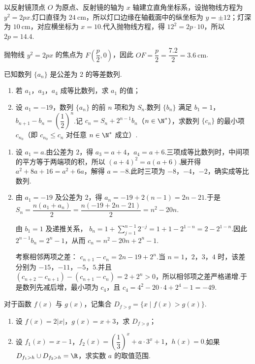 \begin{solution}
以反射镜顶点 \(O\) 为原点、反射镜的轴为 \(x\) 轴建立直角坐标系，设抛物线方程为 \(y^2=2px\).灯口直径为 \(24\mathrm{~cm}\)，所以灯口边缘在轴截面中的纵坐标为 \(y=\pm12\)；灯深为 \(10\mathrm{~cm}\)，对应横坐标为 \(x=10\).代入抛物线方程，得
\(12^2=2p\cdot10\)，所以 \(2p=14.4\).

抛物线 \(y^2=2px\) 的焦点为 \(F\left(\dfrac p2,0\right)\)，因此
\(OF=\dfrac p2=\dfrac{7.2}{2}=3.6\mathrm{~cm}\).
\end{solution}

\begin{problem}
已知数列 \(\{a_n\}\) 是公差为 \(2\) 的等差数列.

\begin{enumerate}
\item 若 \(a_1\)，\(a_3\)，\(a_4\) 成等比数列，求 \(a_1\) 的值；
\item 设 \(a_1=-19\)，数列 \(\{a_n\}\) 的前 \(n\) 项和为 \(S_n\).数列 \(\{b_n\}\) 满足 \(b_1=1\)，\(b_{n+1}-b_n=\left(\dfrac12\right)^n\).记 \(c_n=S_n+2^{n-1}b_n\)（\(n\in\N^*\)），求数列 \(\{c_n\}\) 的最小项 \(c_{n_0}\)（即 \(c_{n_0}\leq c_n\) 对任意 \(n\in\N^*\) 成立）.
\end{enumerate}
\end{problem}

\begin{solution}
\begin{enumerate}
\item 设 \(a_1=a\).由公差为 \(2\)，得 \(a_3=a+4\)，\(a_4=a+6\).三项成等比数列时，中间项的平方等于两端项的积，所以
\((a+4)^2=a(a+6)\).展开得 \(a^2+8a+16=a^2+6a\)，解得 \(a=-8\).此时三项为 \(-8\)，\(-4\)，\(-2\)，确实成等比数列.

\item 由 \(a_1=-19\) 及公差为 \(2\)，得 \(a_n=-19+2(n-1)=2n-21\).于是
\(S_n=\dfrac{n(a_1+a_n)}2=\dfrac{n(-19+2n-21)}2=n^2-20n\).

由 \(b_1=1\) 及递推关系，
\(b_n=1+\sum_{j=1}^{n-1}2^{-j}=1+1-2^{1-n}=2-2^{1-n}\).因此 \(2^{n-1}b_n=2^n-1\)，从而
\(c_n=n^2-20n+2^n-1\).

考察相邻两项之差：
\(c_{n+1}-c_n=2n-19+2^n\).当 \(n=1\)，\(2\)，\(3\)，\(4\) 时，该差分别为 \(-15\)，\(-11\)，\(-5\)，\(5\).并且
\((c_{n+2}-c_{n+1})-(c_{n+1}-c_n)=2+2^n>0\)，所以相邻项之差严格递增.于是数列先减后增，最小项为 \(c_4\)，且
\(c_4=4^2-20\cdot4+2^4-1=-49\).
\end{enumerate}
\end{solution}

\begin{problem}
对于函数 \(f(x)\) 与 \(g(x)\)，记集合 \(D_{f>g}=\{x\mid f(x)>g(x)\}\).

\begin{enumerate}
\item 设 \(f(x)=2\lvert x\rvert\)，\(g(x)=x+3\)，求 \(D_{f>g}\)；
\item 设 \(f_1(x)=x-1\)，\(f_2(x)=\left(\dfrac13\right)^x+a\cdot3^x+1\)，\(h(x)=0\).如果 \(D_{f_1>h}\cup D_{f_2>h}=\R\)，求实数 \(a\) 的取值范围.
\end{enumerate}
\end{problem}

